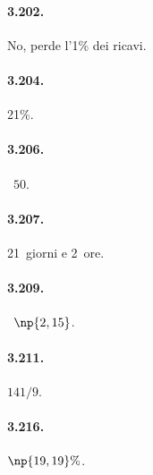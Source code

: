 \begin{multicols}{2}
\paragraph{3.202.} No, perde l'1\% dei ricavi.

\paragraph{3.204.} 21\%.

\paragraph{3.206.} \officialeuro~$50$.

\paragraph{3.207.} 21~giorni e 2~ore.

\paragraph{3.209.} \officialeuro~$\np{2,15}$.

\paragraph{3.211.} $ 141/9 $.

\paragraph{3.216.} $\np{19,19}\%$.

\end{multicols}
